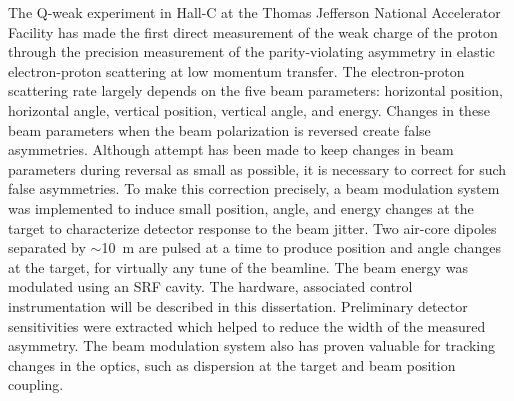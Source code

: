 


The Q-weak experiment in Hall-C at the Thomas Jefferson National Accelerator Facility has made the first direct measurement of the weak charge of the proton through the precision measurement of the parity-violating asymmetry in elastic electron-proton scattering at low momentum transfer. The electron-proton scattering rate largely depends on the five beam parameters: horizontal position, horizontal angle, vertical position, vertical angle, and energy. Changes in these beam parameters when the beam polarization is reversed create false asymmetries. 
Although attempt has been made to keep changes in beam parameters during reversal as small as possible, it is necessary to correct for such false asymmetries. 
To make this correction precisely, a beam modulation system was implemented to induce small position, angle, and energy changes at the target to characterize detector response to the beam jitter.
Two air-core dipoles separated by $\sim$10~m are pulsed at a time to produce position and angle changes at the target, for virtually any tune of the beamline. The beam energy was modulated using an SRF cavity. 
The hardware, associated control instrumentation will be described in this dissertation. Preliminary detector sensitivities were extracted which helped to reduce the width of the measured asymmetry. The beam modulation system also has proven valuable for tracking changes in the optics, such as dispersion at the target and beam position coupling.

